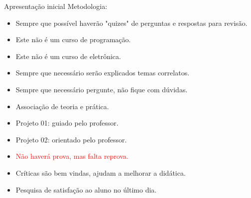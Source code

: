 
\begin{frame}{Apresentação inicial}
    Metodologia:
    \begin{itemize}
        \item Sempre que possível haverão "quizes" de perguntas e respostas para revisão.
        \item Este não é um curso de programação.
        \item Este não é um curso de eletrônica.
        \item Sempre que necessário serão explicados temas correlatos.
        \item Sempre que necessário pergunte, não fique com dúvidas.
        \item Associação de teoria e prática.
        \item Projeto 01: guiado pelo professor.
        \item Projeto 02: orientado pelo professor.
        \item \textcolor{red}{Não haverá prova, mas falta reprova.}
        \item Críticas são bem vindas, ajudam a melhorar a didática.
        \item Pesquisa de satisfação ao aluno no último dia.
    \end{itemize}
\end{frame}